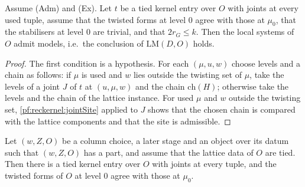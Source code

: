 \begin{theorem}\label{pf:reckernel:modelsJoints}
Assume \textup{(Adm)} and \textup{(Ex)}. Let $t$ be a tied kernel entry over $O$ with joints at every used tuple, assume
that the twisted forms at level $0$ agree with those at $\mu_0$, that the stabilisers at level $0$ are trivial, and that
$2r_G\le k$. Then the local systems of $O$ admit models, i.e.\ the conclusion of $\mathrm{LM}(D,O)$ holds.
\end{theorem}

\begin{proof}
The first condition is a hypothesis. For each $(\mu,u,w)$ choose levels and a chain as follows: if $\mu$ is used and $w$
lies outside the twisting set of $\mu$, take the levels of a joint $J$ of $t$ at $(u,\mu,w)$ and the chain
$\mathrm{ch}(H)$; otherwise take the levels and the chain of the lattice instance. For used $\mu$ and $w$ outside the
twisting set, \cref{pf:reckernel:jointSite} applied to $J$ shows that the chosen chain is compared with the lattice
components and that the site is admissible.
\end{proof}

\begin{theorem}\label{pf:reckernel:jointsStd}
Let $(w,Z,O)$ be a column choice, a later stage and an object over its datum such that $(w,Z,O)$ has a part, and assume
that the lattice data of $O$ are tied. Then there is a tied kernel entry over $O$ with joints at every tuple, and the
twisted forms of $O$ at level $0$ agree with those at $\mu_0$.
\end{theorem}

